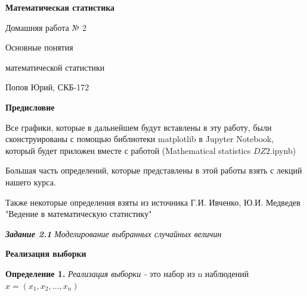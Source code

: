 \documentclass[a4paper,12pt, oneside]{book}
\begin{document}
	\pagestyle{plain}
	
	\begin{titlepage}	
		\begin{center}
			{\Huge \textbf{Математическая статистика}}
			\vspace{30mm}
			
			{\Huge Домашняя работа № 2 \\}
			\vspace{30mm}
			
			{\huge Основные понятия 
				
				математической статистики}
			\vspace{30mm}
			
			{\Large Попов Юрий, СКБ-172}
		\end{center}
	\end{titlepage}
	
	
	
	\begin{spacing}{0.99}          
		\tableofcontents %
	\end{spacing}

\newpage
\begin{center}
	{\Huge{\bf{Предисловие}}}
\end{center}

\vspace{5mm}
Все графики, которые в дальнейшем будут вставлены в эту работу, были сконструированы с помощью библиотеки matplotlib в Jupyter Notebook, который будет приложен вместе с работой (Mathematical statistics $DZ2$.ipynb)
\vspace{5mm}

Большая часть определений, которые представлены в этой работы взять с лекций нашего курса. 
\vspace{5mm}

Также некоторые определения взяты из источника   Г.И. Ивченко, Ю.И. Медведев \\
"Ведение в математическую статистику"

 
\newpage
{\large\textit{\textbf{Задание 2.1} Моделирование выбранных случайных величин}}

\vspace{5mm}
	\large{\textbf{Реализация выборки}}
\vspace{5mm}

\normalsize{\textbf{Определение 1.}} \textit{Реализация выборки - }это набор из n наблюдений $\hat{x} = (x_1, x_2, \ldots, x_n)$
\end{document}
